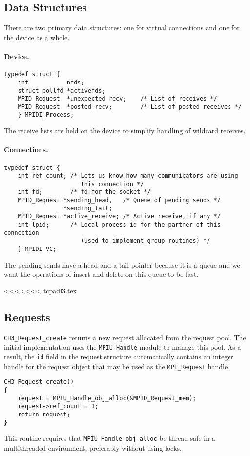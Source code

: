 \documentclass{article}
\def\code{\begingroup\makeustext\eatcode}
\def\eatcode#1{\texttt{#1}\endgroup}
\begin{document}
\subsection{Data Structures}
There are two primary data structures: one for virtual connections and one for
the device as a whole.

\paragraph{Device.}
\begin{verbatim}
typedef struct {
    int           nfds;
    struct pollfd *activefds;
    MPID_Request  *unexpected_recv;    /* List of receives */
    MPID_Request  *posted_recv;        /* List of posted receives */
    } MPIDI_Process;
\end{verbatim}
The receive lists are held on the device to simplify handling of wildcard
receives.  

\paragraph{Connections.}

\begin{verbatim}
typedef struct { 
    int ref_count; /* Lets us know how many communicators are using
                      this connection */
    int fd;        /* fd for the socket */
    MPID_Request *sending_head,   /* Queue of pending sends */
                 *sending_tail;
    MPID_Request *active_receive; /* Active receive, if any */
    int lpid;      /* Local process id for the partner of this connection
                      (used to implement group routines) */
    } MPIDI_VC;
\end{verbatim}
The pending sends have a head and a tail pointer because it is a queue and we
want the operations of insert and delete on this queue to be fast.

<<<<<<< tcpadi3.tex
\subsection{Requests}
\code{CH3_Request_create} returns a new request allocated from the
request pool.  The initial implementation uses the \code{MPIU_Handle}
module to manage this pool.  As a result, the \code{id} field in the
request structure automatically contains an integer handle for the
request object that may be used as the \code{MPI_Request} handle.
\begin{verbatim}
CH3_Request_create() 
{
    request = MPIU_Handle_obj_alloc(&MPID_Request_mem);
    request->ref_count = 1;
    return request;
}
\end{verbatim}
This routine requires that \code{MPIU_Handle_obj_alloc} be thread safe in a
multithreaded environment, preferably without using locks.
\end{document}

